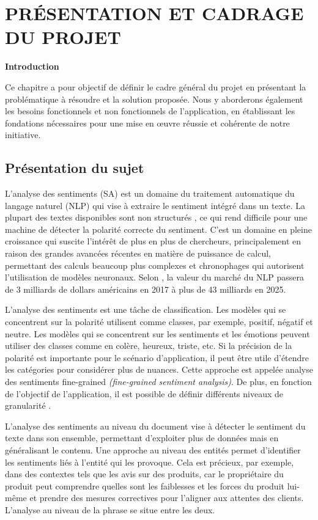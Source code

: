 \newpage
{}
\chapter{PRÉSENTATION ET CADRAGE DU PROJET}







\textbf{Introduction} \par
Ce chapitre a pour objectif de définir le cadre général du projet en présentant la problématique à résoudre et la solution proposée. Nous y aborderons également les besoins fonctionnels et non fonctionnels de l'application, en établissant les fondations nécessaires pour une mise en œuvre réussie et cohérente de notre initiative.





\section{Présentation du sujet}
L'analyse des sentiments (SA) est un domaine du traitement automatique du langage naturel (NLP) qui vise à extraire le sentiment intégré dans un texte. La plupart des textes disponibles sont non structurés \cite{salehinejad2018}, ce qui rend difficile pour une machine de détecter la polarité correcte du sentiment. C'est un domaine en pleine croissance qui suscite l'intérêt de plus en plus de chercheurs, principalement en raison des grandes avancées récentes en matière de puissance de calcul, permettant des calculs beaucoup plus complexes et chronophages qui autorisent l'utilisation de modèles neuronaux. Selon \cite{liu2015mining}, la valeur du marché du NLP passera de 3 milliards de dollars américains en 2017 à plus de 43 milliards en 2025.\par
L'analyse des sentiments est une tâche de classification. Les modèles qui se concentrent sur la polarité utilisent comme classes, par exemple, positif, négatif et neutre. Les modèles qui se concentrent sur les sentiments et les émotions peuvent utiliser des classes comme en colère, heureux, triste, etc. Si la précision de la polarité est importante pour le scénario d'application, il peut être utile d'étendre les catégories pour considérer plus de nuances. Cette approche est appelée analyse des sentiments fine-grained \textit{(fine-grained sentiment analysis)}. 
De plus, en fonction de l'objectif de l'application, il est possible de définir différents niveaux de granularité \cite{Balaji2017}.  \par L'analyse des sentiments au niveau du document vise à détecter le sentiment du texte dans son ensemble, permettant d'exploiter plus de données mais en généralisant le contenu. Une approche au niveau des entités permet d'identifier les sentiments liés à l'entité qui les provoque. Cela est précieux, par exemple, dans des contextes tels que les avis sur des produits, car le propriétaire du produit peut comprendre quelles sont les faiblesses et les forces du produit lui-même et prendre des mesures correctives pour l'aligner aux attentes des clients. L'analyse au niveau de la phrase se situe entre les deux.

